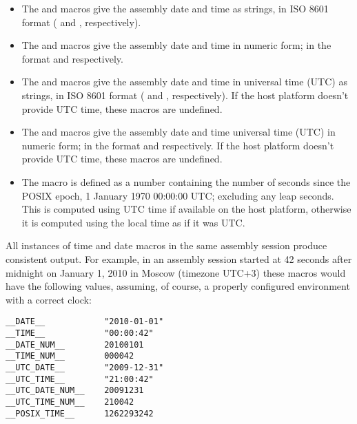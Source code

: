\begin{itemize}
    \item{The  and 
        macros give the assembly date and time as strings, in ISO 8601
        format ( and , respectively).}

    \item{The  and 
        macros give the assembly date and time in numeric form; in the format
         and  respectively.}

    \item{The  and 
        macros give the assembly date and time in universal time (UTC) as strings,
        in ISO 8601 format ( and , respectively).
        If the host platform doesn't provide UTC time, these macros are undefined.}

    \item{The  and 
        macros give the assembly date and time universal time (UTC) in numeric form;
        in the format  and  respectively. If the
        host platform doesn't provide UTC time, these macros are undefined.}

    \item{The  macro is defined as a number containing
        the number of seconds since the POSIX epoch, 1 January 1970 00:00:00 UTC;
        excluding any leap seconds. This is computed using UTC time if
        available on the host platform, otherwise it is computed using the
        local time as if it was UTC.}
\end{itemize}

All instances of time and date macros in the same assembly session
produce consistent output.  For example, in an assembly session
started at 42 seconds after midnight on January 1, 2010 in Moscow
(timezone UTC+3) these macros would have the following values,
assuming, of course, a properly configured environment with a correct
clock:

\begin{lstlisting}
__DATE__            "2010-01-01"
__TIME__            "00:00:42"
__DATE_NUM__        20100101
__TIME_NUM__        000042
__UTC_DATE__        "2009-12-31"
__UTC_TIME__        "21:00:42"
__UTC_DATE_NUM__    20091231
__UTC_TIME_NUM__    210042
__POSIX_TIME__      1262293242
\end{lstlisting}

